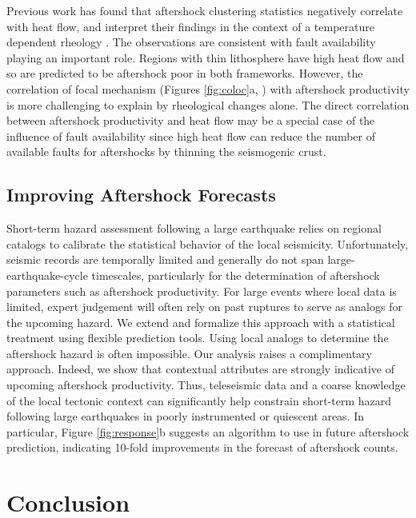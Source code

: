 \documentclass[draft, jgrga]{agujournal2018}
\begin{document}
Previous work has found that aftershock clustering statistics negatively correlate with heat flow, and interpret their findings in the context of a temperature dependent rheology \citep{Ben-Zion2006AnalysisRheology, Zaliapin2016AClusters}. The observations are consistent with fault availability playing an important role. Regions with thin lithosphere have high heat flow and so are predicted to be aftershock poor in both frameworks. However, the correlation of focal mechanism (Figures \ref{fig:coloc}a, ) with aftershock productivity is more challenging to explain by rheological changes alone. The direct correlation between aftershock productivity and heat flow may be a special case of the influence of fault availability since high heat flow can reduce the number of available faults for aftershocks by thinning the seismogenic crust.
    
\subsection{Improving Aftershock Forecasts}
 
Short-term hazard assessment following a large earthquake relies on regional catalogs to calibrate the statistical behavior of the local seismicity. Unfortunately, seismic records are temporally limited and generally do not span large-earthquake-cycle timescales, particularly for the determination of aftershock parameters such as aftershock productivity. For large events where local data is limited, expert judgement will often rely on past ruptures to serve as analogs for the upcoming hazard. We extend and formalize this approach with a statistical treatment using flexible prediction tools. Using local analogs to determine the aftershock hazard is often impossible. Our analysis raises a complimentary approach. Indeed, we show that contextual attributes are strongly indicative of upcoming aftershock productivity. Thus, teleseismic data and a coarse knowledge of the local tectonic context can significantly help constrain short-term hazard following large earthquakes in poorly instrumented or quiescent areas. In particular, Figure \ref{fig:response}b suggests an algorithm to use in future aftershock prediction, indicating 10-fold improvements in the forecast of aftershock counts.

\section{Conclusion}
\end{document}
